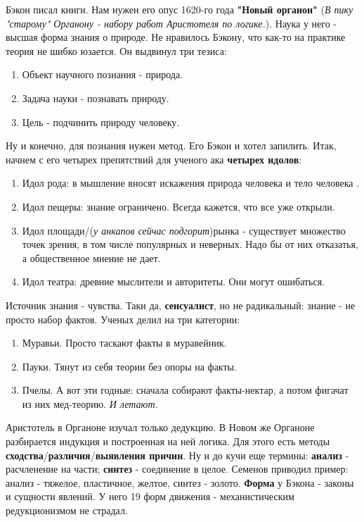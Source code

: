 Бэкон писал книги. Нам нужен его опус 1620-го года \textbf{"Новый органон"} (\textit{В пику "старому" Органону - набору работ Аристотеля по логике.}). Наука у него - высшая форма знания о природе.
Не нравилось Бэкону, что как-то на практике теория не шибко юзается.  Он выдвинул три тезиса:
\begin{enumerate}
\item Объект научного познания - природа.
\item Задача науки - познавать природу.
\item Цель - подчинить природу человеку.
\end{enumerate}
Ну и конечно, для познания нужен метод. Его Бэкон и хотел запилить. Итак, начнем с его четырех препятствий для ученого ака \textbf{четырех идолов}:
\begin{enumerate}
\item Идол рода: в мышление вносят искажения природа человека и тело человека . 
\item Идол пещеры: знание ограничено. Всегда кажется, что все уже открыли.
\item Идол площади/(\textit{у анкапов сейчас подгорит})рынка - существует множество точек зрения, в том числе популярных и неверных. Надо бы  от них отказатья, а общественное мнение не дает.
\item Идол театра: древние мыслители и авторитеты. Они могут ошибаться.
\end{enumerate}

Источник знания - чувства. Таки да, \textbf{сенсуалист}, но не радикальный: знание - не просто набор фактов. Ученых делил на три категории:
\begin{enumerate}
\item Муравьи. Просто таскают факты в муравейник.
\item Пауки. Тянут из себя теории без опоры на факты.
\item Пчелы. А вот эти годные: сначала собирают факты-нектар, а потом фигачат из них мед-теорию. \textit{И летают.}
\end{enumerate}

Аристотель в Органоне изучал только дедукцию. В Новом же Органоне разбирается индукция и построенная на ней логика. Для этого есть методы \textbf{сходства}/\textbf{различия}/\textbf{выявления причин}. Ну и до кучи еще термины: \textbf{анализ} - расчленение на части; \textbf{синтез} - соединение в целое. Семенов приводил пример: анализ - тяжелое, пластичное, желтое, синтез - золото. \textbf{Форма} у Бэкона - законы и сущности явлений. У него 19 форм движения - механистическим редукционизмом не страдал.


